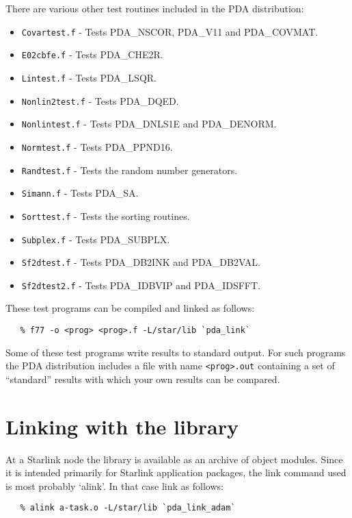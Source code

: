    There are various other test routines included in the PDA distribution:
\begin{itemize}
\item {\tt Covartest.f} - Tests PDA\_NSCOR, PDA\_V11 and PDA\_COVMAT.
\item {\tt E02cbfe.f} - Tests PDA\_CHE2R.
\item {\tt Lintest.f} - Tests PDA\_LSQR.
\item {\tt Nonlin2test.f} - Tests PDA\_DQED.
\item {\tt Nonlintest.f} - Tests PDA\_DNLS1E and PDA\_DENORM.
\item {\tt Normtest.f} - Tests PDA\_PPND16.
\item {\tt Randtest.f} - Tests the random number generators.
\item {\tt Simann.f} - Tests PDA\_SA.
\item {\tt Sorttest.f} - Tests the sorting routines.
\item {\tt Subplex.f} - Tests PDA\_SUBPLX.
\item {\tt Sf2dtest.f} - Tests PDA\_DB2INK and PDA\_DB2VAL.
\item {\tt Sf2dtest2.f} - Tests PDA\_IDBVIP and PDA\_IDSFFT.
\end{itemize}

These test programs can be compiled and linked as follows:

\begin{verbatim}
   % f77 -o <prog> <prog>.f -L/star/lib `pda_link`
\end{verbatim}

Some of these test programs write results to standard output. For such
programs the PDA distribution includes a file with name \verb+<prog>.out+
containing a set of ``standard'' results with which your own results can
be compared.


\section{\label{LINKING}Linking with the library}

   At a Starlink node the library is available as an archive of object
   modules. Since it is intended
   primarily for Starlink application packages, the link command used is
   most probably `alink'. In that case link as follows:

\begin{verbatim}
   % alink a-task.o -L/star/lib `pda_link_adam`
\end{verbatim}


